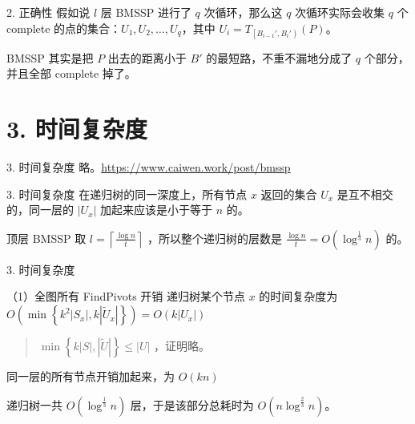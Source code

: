\documentclass{beamer}
\begin{document}
\begin{frame}{2. 正确性}
  假如说 $l$ 层 BMSSP 进行了 $q$ 次循环，那么这 $q$ 次循环实际会收集 $q$ 个 complete 的点的集合：$U_1, U_2, \dots, U_q$，其中 $U_i = T_{\left [ B_{i-1}',B_i' \right)}(P)$。

  \pause\vspace{0.4em}
  BMSSP 其实是把 $P$ 出去的距离小于 $B'$ 的最短路，不重不漏地分成了 $q$ 个部分，并且全部 complete 掉了。
\end{frame}

\section{3. 时间复杂度}

\begin{frame}{3. 时间复杂度}
  略。\url{https://www.caiwen.work/post/bmssp}
\end{frame}

\begin{frame}{3. 时间复杂度}
  在递归树的同一深度上，所有节点 $x$ 返回的集合 $U_x$ 是互不相交的，同一层的 $|U_x|$ 加起来应该是小于等于 $n$ 的。

  \pause\vspace{0.35em}
  顶层 BMSSP 取 $l=\left\lceil \frac{\log n}{t} \right\rceil$ ，所以整个递归树的层数是 $\frac{\log n}{t}=O(\log ^{\frac{1}{3}} n)$ 的。
\end{frame}
\begin{frame}{3. 时间复杂度}
  \begin{block}{（1）全图所有 FindPivots 开销}
    递归树某个节点 $x$ 的时间复杂度为 $O(\min\left\{ k^2|S_x|, k|\widetilde{U}_x| \right\}) = O(k|U_x|)$

    \pause
    \begin{quote}
      $\min\left\{ k|S|, |\widetilde{U}| \right\} \le |U|$ ，证明略。
    \end{quote}

    \pause\vspace{0.35em}
    同一层的所有节点开销加起来，为 $O(kn)$

    \pause\vspace{0.35em}
    递归树一共 $O(\log ^{\frac{1}{3}} n)$ 层，于是该部分总耗时为 $O(n\log^{\frac{2}{3}}n)$。
  \end{block}
\end{frame}
\end{document}
